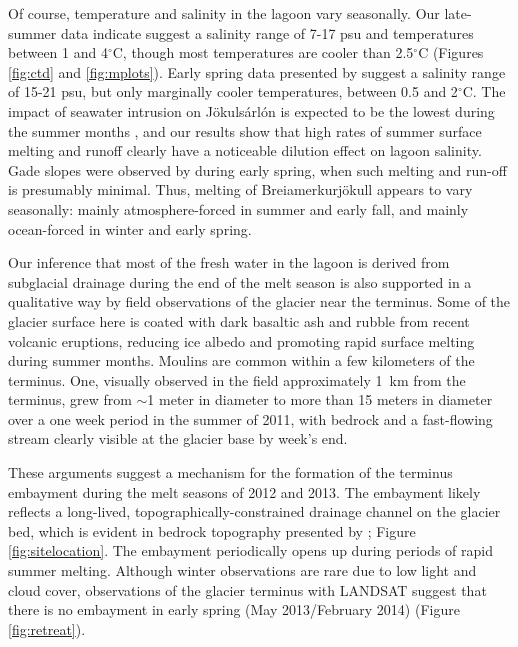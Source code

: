\documentclass[review]{igs}
\begin{document}
Of course, temperature and salinity in the lagoon vary seasonally.  Our late-summer data indicate suggest a salinity range of 7-17 psu and temperatures between 1 and 4$^{\circ}$C, though most temperatures are cooler than 2.5$^{\circ}$C (Figures \ref{fig:ctd} and \ref{fig:mplots}).  Early spring data presented by \citet{brandon2013hydrographic} suggest a salinity range of 15-21 psu, but only marginally cooler temperatures, between 0.5 and 2$^{\circ}$C.   The impact of seawater intrusion on Jökulsárlón is expected to be the lowest during the summer months \citep{landl2003energy}, and our results show that high rates of summer surface melting and runoff clearly have a noticeable dilution effect on lagoon salinity.  Gade slopes were observed by \citet{brandon2013hydrographic} during early spring, when such melting and run-off is presumably minimal.  Thus, melting of Brei{\dh}amerkurjökull appears to vary seasonally: mainly atmosphere-forced in summer and early fall, and mainly ocean-forced in winter and early spring. 


Our inference that most of the fresh water in the lagoon is derived from subglacial drainage during the end of the melt season is also supported in a qualitative way by field observations of the glacier near the terminus.  Some of the glacier surface here is coated with dark basaltic ash and rubble from recent volcanic eruptions, reducing ice albedo and promoting rapid surface melting during summer months.  Moulins are common within a few kilometers of the terminus. One, visually observed in the field approximately 1~km from the terminus, grew from $\sim$1 meter in diameter to more than 15 meters in diameter over a one week period in the summer of 2011, with bedrock and a fast-flowing stream clearly visible at the glacier base by week’s end.

 These arguments suggest a mechanism for the formation of the terminus embayment during the melt seasons of 2012 and 2013.  The embayment likely reflects a long-lived, topographically-constrained drainage channel on the glacier bed, which is evident in bedrock topography presented by \citet{bjornsson2001jokulsarlon}; Figure \ref{fig:sitelocation}. The embayment periodically opens up during periods of rapid summer melting. 
 Although winter observations are rare due to low light and cloud cover, observations of the glacier terminus with LANDSAT suggest that there is no embayment in early spring (May 2013/February 2014) (Figure \ref{fig:retreat}).
\end{document}

